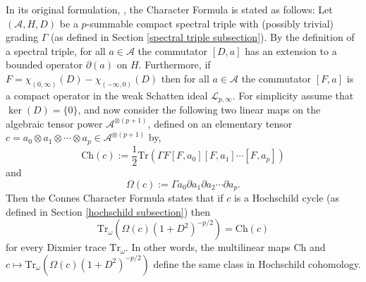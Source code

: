     In its original formulation, \cite{Connes-original-spectral-1995}, the Character Formula is stated as follows: Let $(\mathcal{A},H,D)$ be a $p$-summable compact spectral triple
    with (possibly trivial) grading $\Gamma$ (as defined in Section \ref{spectral triple subsection}).
    By the definition of a spectral triple, for all $a \in \mathcal{A}$ the commutator $[D,a]$ has an extension to a bounded operator $\partial(a)$ on $H$. Furthermore, if $F = \chi_{(0,\infty)}(D)-\chi_{(-\infty,0)}(D)$
    then for all $a \in \mathcal{A}$ the commutator $[F,a]$ is a compact operator in the weak Schatten ideal $\mathcal{L}_{p,\infty}$. 
    For simplicity assume that $\ker(D) = \{0\}$, and now consider the following two linear maps on the algebraic tensor power $\mathcal{A}^{\otimes(p+1)}$,
    defined on an elementary tensor $c = a_0\otimes a_1\otimes \cdots \otimes a_p \in \mathcal{A}^{\otimes(p+1)}$ by,
    \begin{equation*}
        \mathrm{Ch}(c) := \frac{1}{2}\mathrm{Tr}(\Gamma F[F,a_0][F,a_1]\cdots[F,a_p])
    \end{equation*} 
    and
    \begin{equation*}
        \Omega(c) := \Gamma a_0\partial a_1\partial a_2\cdots \partial a_p.
    \end{equation*}
    Then the Connes Character Formula states that if $c$ is a Hochschild cycle (as defined in Section \ref{hochschild subsection}) then
    \begin{equation*}
        \mathrm{Tr}_\omega(\Omega(c)(1+D^2)^{-p/2}) = \mathrm{Ch}(c)
    \end{equation*}
    for every Dixmier trace $\mathrm{Tr}_\omega$. In other words, the multilinear maps $\mathrm{Ch}$ and $c \mapsto \mathrm{Tr}_\omega(\Omega(c)(1+D^2)^{-p/2})$ define
    the same class in Hochschild cohomology.
    
%     
    
